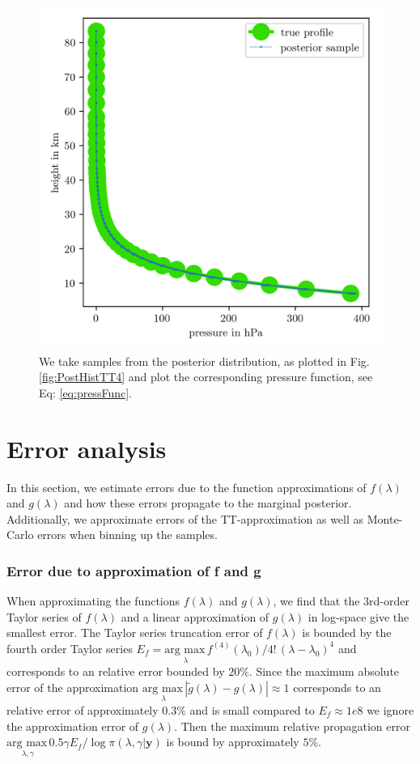 \begin{figure}[ht!]
	\centering
	\includegraphics{PressPostMeanSigm.png}
	\caption[Pressure posterior samples.]{We take samples from the posterior distribution, as plotted in Fig. \ref{fig:PostHistTT4} and plot the corresponding pressure function, see Eq: \ref{eq:pressFunc}.}
	\label{fig:PressPost}
\end{figure}
\clearpage


\section{Error analysis}
In this section, we estimate errors due to the function approximations of $f(\lambda)$ and $g(\lambda)$ and how these errors propagate to the marginal posterior.
Additionally, we approximate errors of the TT-approximation as well as Monte-Carlo errors when binning up the samples.

\subsubsection{Error due to approximation of f and g}
\label{sec:fgErros}
When approximating the functions $f(\lambda)$ and $g(\lambda)$, we find that the 3rd-order Taylor series of $f(\lambda)$ and a linear approximation of $g(\lambda)$ in log-space give the smallest error.
The Taylor series truncation error of $f(\lambda)$ is bounded by the fourth order Taylor series $E_f = \underset{\lambda}{\text{arg max}\,} f^{(4)}(\lambda_0)/ 4! \, (\lambda - \lambda_{0} )^4$ and corresponds to an relative error bounded by $20\%$.
Since the maximum absolute error of the approximation $\underset{\lambda}{\text{arg max}\,}|\tilde{g}(\lambda) - g(\lambda) | \approx 1$ corresponds to an relative error of approximately $0.3\%$ and is small compared to $E_f \approx 1e8$ we ignore the approximation error of $g(\lambda)$.
Then the maximum relative propagation error $\underset{\lambda, \gamma}{\text{arg max}\,} 0.5 \gamma  E_f / \log{\pi{(\lambda ,\gamma | \bm{y})}} $ is bound by approximately $5\%$.
